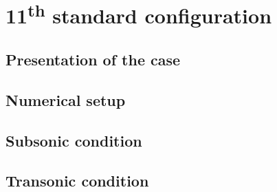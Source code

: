 \chapter{11\texorpdfstring{\textsuperscript{th}}{th} standard configuration}
\label{cha:stcf11}

\chabstract{}

\minitoc
\newpage

\section{Presentation of the case}
\label{sec:stcf11_presentation}


\section{Numerical setup}
\label{sec:stcf11_numerical}


\section{Subsonic condition}
\label{sec:stcf11_subsonic}


\section{Transonic condition}
\label{sec:stcf11_transonic}


\chconclu{}
